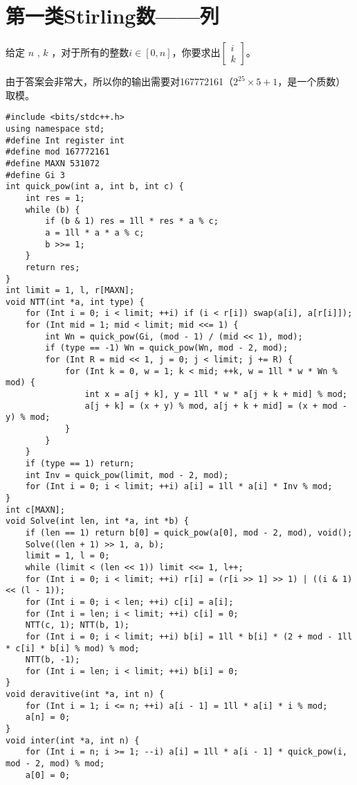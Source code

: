 \section{第一类Stirling数——列}
\par \noindent 给定 $n$ , $k$ ，对于所有的整数$i\in[0,n]$，你要求出$\begin{bmatrix}i\\ k\end{bmatrix}$。
~\\
\par \noindent 由于答案会非常大，所以你的输出需要对167772161（$2^{25}\times 5+1$，是一个质数）取模。
\begin{verbatim}
#include <bits/stdc++.h>
using namespace std;
#define Int register int
#define mod 167772161
#define MAXN 531072
#define Gi 3
int quick_pow(int a, int b, int c) {
    int res = 1;
    while (b) {
        if (b & 1) res = 1ll * res * a % c;
        a = 1ll * a * a % c;
        b >>= 1;
    }
    return res;
}
int limit = 1, l, r[MAXN];
void NTT(int *a, int type) {
    for (Int i = 0; i < limit; ++i) if (i < r[i]) swap(a[i], a[r[i]]);
    for (Int mid = 1; mid < limit; mid <<= 1) {
        int Wn = quick_pow(Gi, (mod - 1) / (mid << 1), mod);
        if (type == -1) Wn = quick_pow(Wn, mod - 2, mod);
        for (Int R = mid << 1, j = 0; j < limit; j += R) {
            for (Int k = 0, w = 1; k < mid; ++k, w = 1ll * w * Wn % mod) {
                int x = a[j + k], y = 1ll * w * a[j + k + mid] % mod;
                a[j + k] = (x + y) % mod, a[j + k + mid] = (x + mod - y) % mod;
            }
        }
    }
    if (type == 1) return;
    int Inv = quick_pow(limit, mod - 2, mod);
    for (Int i = 0; i < limit; ++i) a[i] = 1ll * a[i] * Inv % mod;
}
int c[MAXN];
void Solve(int len, int *a, int *b) {
    if (len == 1) return b[0] = quick_pow(a[0], mod - 2, mod), void();
    Solve((len + 1) >> 1, a, b);
    limit = 1, l = 0;
    while (limit < (len << 1)) limit <<= 1, l++;
    for (Int i = 0; i < limit; ++i) r[i] = (r[i >> 1] >> 1) | ((i & 1) << (l - 1));
    for (Int i = 0; i < len; ++i) c[i] = a[i];
    for (Int i = len; i < limit; ++i) c[i] = 0;
    NTT(c, 1); NTT(b, 1);
    for (Int i = 0; i < limit; ++i) b[i] = 1ll * b[i] * (2 + mod - 1ll * c[i] * b[i] % mod) % mod;
    NTT(b, -1);
    for (Int i = len; i < limit; ++i) b[i] = 0;
}
void deravitive(int *a, int n) {
    for (Int i = 1; i <= n; ++i) a[i - 1] = 1ll * a[i] * i % mod;
    a[n] = 0;
}
void inter(int *a, int n) {
    for (Int i = n; i >= 1; --i) a[i] = 1ll * a[i - 1] * quick_pow(i, mod - 2, mod) % mod;
    a[0] = 0;

\end{verbatim}

